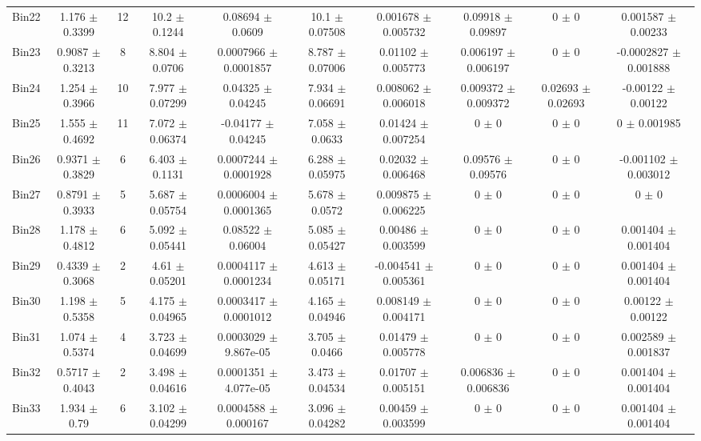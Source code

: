 \begin{tabular}{@{\extracolsep{4pt}}lccccccccc@{}}
     Bin22 & 1.176 $\pm$ 0.3399 & 12 & 10.2 $\pm$ 0.1244 & 0.08694 $\pm$ 0.0609 & 10.1 $\pm$ 0.07508 & 0.001678 $\pm$ 0.005732 & 0.09918 $\pm$ 0.09897 & 0 $\pm$ 0 & 0.001587 $\pm$ 0.00233 \\ 
     Bin23 & 0.9087 $\pm$ 0.3213 & 8 & 8.804 $\pm$ 0.0706 & 0.0007966 $\pm$ 0.0001857 & 8.787 $\pm$ 0.07006 & 0.01102 $\pm$ 0.005773 & 0.006197 $\pm$ 0.006197 & 0 $\pm$ 0 & -0.0002827 $\pm$ 0.001888 \\ 
     Bin24 & 1.254 $\pm$ 0.3966 & 10 & 7.977 $\pm$ 0.07299 & 0.04325 $\pm$ 0.04245 & 7.934 $\pm$ 0.06691 & 0.008062 $\pm$ 0.006018 & 0.009372 $\pm$ 0.009372 & 0.02693 $\pm$ 0.02693 & -0.00122 $\pm$ 0.00122 \\ 
     Bin25 & 1.555 $\pm$ 0.4692 & 11 & 7.072 $\pm$ 0.06374 & -0.04177 $\pm$ 0.04245 & 7.058 $\pm$ 0.0633 & 0.01424 $\pm$ 0.007254 & 0 $\pm$ 0 & 0 $\pm$ 0 & 0 $\pm$ 0.001985 \\ 
     Bin26 & 0.9371 $\pm$ 0.3829 & 6 & 6.403 $\pm$ 0.1131 & 0.0007244 $\pm$ 0.0001928 & 6.288 $\pm$ 0.05975 & 0.02032 $\pm$ 0.006468 & 0.09576 $\pm$ 0.09576 & 0 $\pm$ 0 & -0.001102 $\pm$ 0.003012 \\ 
     Bin27 & 0.8791 $\pm$ 0.3933 & 5 & 5.687 $\pm$ 0.05754 & 0.0006004 $\pm$ 0.0001365 & 5.678 $\pm$ 0.0572 & 0.009875 $\pm$ 0.006225 & 0 $\pm$ 0 & 0 $\pm$ 0 & 0 $\pm$ 0 \\ 
     Bin28 & 1.178 $\pm$ 0.4812 & 6 & 5.092 $\pm$ 0.05441 & 0.08522 $\pm$ 0.06004 & 5.085 $\pm$ 0.05427 & 0.00486 $\pm$ 0.003599 & 0 $\pm$ 0 & 0 $\pm$ 0 & 0.001404 $\pm$ 0.001404 \\ 
     Bin29 & 0.4339 $\pm$ 0.3068 & 2 & 4.61 $\pm$ 0.05201 & 0.0004117 $\pm$ 0.0001234 & 4.613 $\pm$ 0.05171 & -0.004541 $\pm$ 0.005361 & 0 $\pm$ 0 & 0 $\pm$ 0 & 0.001404 $\pm$ 0.001404 \\ 
     Bin30 & 1.198 $\pm$ 0.5358 & 5 & 4.175 $\pm$ 0.04965 & 0.0003417 $\pm$ 0.0001012 & 4.165 $\pm$ 0.04946 & 0.008149 $\pm$ 0.004171 & 0 $\pm$ 0 & 0 $\pm$ 0 & 0.00122 $\pm$ 0.00122 \\ 
     Bin31 & 1.074 $\pm$ 0.5374 & 4 & 3.723 $\pm$ 0.04699 & 0.0003029 $\pm$ 9.867e-05 & 3.705 $\pm$ 0.0466 & 0.01479 $\pm$ 0.005778 & 0 $\pm$ 0 & 0 $\pm$ 0 & 0.002589 $\pm$ 0.001837 \\ 
     Bin32 & 0.5717 $\pm$ 0.4043 & 2 & 3.498 $\pm$ 0.04616 & 0.0001351 $\pm$ 4.077e-05 & 3.473 $\pm$ 0.04534 & 0.01707 $\pm$ 0.005151 & 0.006836 $\pm$ 0.006836 & 0 $\pm$ 0 & 0.001404 $\pm$ 0.001404 \\ 
     Bin33 & 1.934 $\pm$ 0.79 & 6 & 3.102 $\pm$ 0.04299 & 0.0004588 $\pm$ 0.000167 & 3.096 $\pm$ 0.04282 & 0.00459 $\pm$ 0.003599 & 0 $\pm$ 0 & 0 $\pm$ 0 & 0.001404 $\pm$ 0.001404 \\ 

\end{tabular}
